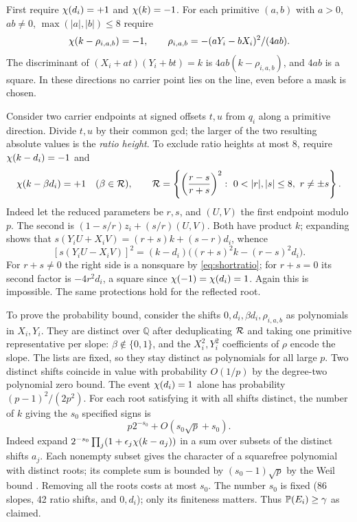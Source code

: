 \documentclass[11pt]{article}
\begin{document}
First require $\chi(d_i)=+1$ and $\chi(k)=-1$. For each primitive $(a,b)$ with $a>0$, $ab\ne0$, $\max(|a|,|b|)\le8$ require
\begin{equation}\label{eq:shortslope}
 \chi(k-\rho_{i,a,b})=-1,\qquad \rho_{i,a,b}=-(aY_i-bX_i)^2/(4ab).
\end{equation}
The discriminant of $(X_i+at)(Y_i+bt)=k$ is $4ab(k-\rho_{i,a,b})$, and $4ab$ is a square. In these directions no carrier point lies on the line, even before a mask is chosen.

Consider two carrier endpoints at signed offsets $t,u$ from $q_i$ along a primitive direction. Divide $t,u$ by their common gcd; the larger of the two resulting absolute values is the \emph{ratio height}. To exclude ratio heights at most 8, require $\chi(k-d_i)=-1$ and
\begin{equation}\label{eq:shortratio}
 \ch(k-\beta d_i)=+1\quad(\beta\in\R),\qquad
 \R=\left\{\left(\frac{r-s}{r+s}\right)^2:\ 0<|r|,|s|\le8,\ r\ne\pm s\right\}.
\end{equation}
Indeed let the reduced parameters be $r,s$, and $(U,V)$ the first endpoint modulo $p$. The second is $(1-s/r)z_i+(s/r)(U,V)$. Both have product $k$; expanding shows that $s(Y_iU+X_iV)=(r+s)k+(s-r)d_i$, whence
\[
 [s(Y_iU-X_iV)]^2=(k-d_i)\big((r+s)^2k-(r-s)^2d_i\big).
\]
For $r+s\ne0$ the right side is a nonsquare by \eqref{eq:shortratio}; for $r+s=0$ its second factor is $-4r^2d_i$, a square since $\chi(-1)=\chi(d_i)=1$. Again this is impossible. The same protections hold for the reflected root.

To prove the probability bound, consider the shifts $0,d_i,\beta d_i,\rho_{i,a,b}$ as polynomials in $X_i,Y_i$. They are distinct over $\mathbb Q$ after deduplicating $\mathcal R$ and taking one primitive representative per slope: $\beta\notin\{0,1\}$, and the $X_i^2,Y_i^2$ coefficients of $\rho$ encode the slope. The lists are fixed, so they stay distinct as polynomials for all large $p$. Two distinct shifts coincide in value with probability $O(1/p)$ by the degree-two polynomial zero bound. The event $\chi(d_i)=1$ alone has probability $(p-1)^2/(2p^2)$. For each root satisfying it with all shifts distinct, the number of $k$ giving the $s_0$ specified signs is
\[
 p2^{-s_0}+O(s_0\sqrt p+s_0).
\]
Indeed expand $2^{-s_0}\prod_j(1+\epsilon_j\chi(k-a_j))$ in a sum over subsets of the distinct shifts $a_j$. Each nonempty subset gives the character of a squarefree polynomial with distinct roots; its complete sum is bounded by $(s_0-1)\sqrt p$ by the Weil bound \cite{weil}. Removing all the roots costs at most $s_0$. The number $s_0$ is fixed (86 slopes, 42 ratio shifts, and $0,d_i$); only its finiteness matters. Thus $\mathbb P(E_i)\ge\gamma$ as claimed.
\end{document}
